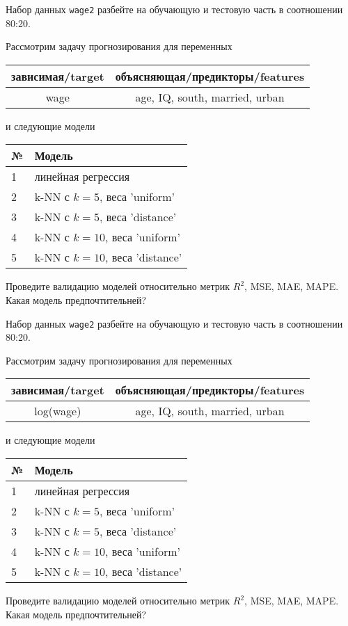 \begin{exercise}
Набор данных \texttt{wage2} разбейте на обучающую и тестовую часть
в соотношении 80:20.

Рассмотрим задачу прогнозирования для переменных
\begin{center}
	\begin{tabular}{|c|c|}\hline
		зависимая/target & объясняющая/предикторы/features \\ \hline
		wage & age, IQ, south, married, urban \\ \hline
	\end{tabular}
\end{center}
и следующие модели
\begin{center}
	\begin{tabular}{|l|l|}\hline
		№ & Модель \\ \hline
		1 & линейная регрессия\\
		2 & k-NN с \(k=5\), веса 'uniform' \\
		3 & k-NN с \(k=5\), веса 'distance' \\
		4 & k-NN с \(k=10\), веса 'uniform' \\
		5 & k-NN с \(k=10\), веса 'distance' \\ \hline
	\end{tabular}
\end{center}
Проведите валидацию моделей относительно метрик \(R^2\), MSE, MAE,
MAPE. Какая модель предпочтительней?
\end{exercise}

\begin{exercise}
Набор данных \texttt{wage2} разбейте на обучающую и тестовую часть
в соотношении 80:20.

Рассмотрим задачу прогнозирования для переменных
\begin{center}
	\begin{tabular}{|c|c|}\hline
		зависимая/target & объясняющая/предикторы/features \\ \hline
		log(wage) & age, IQ, south, married, urban \\ \hline
	\end{tabular}
\end{center}
и следующие модели
\begin{center}
	\begin{tabular}{|l|l|}\hline
		№ & Модель \\ \hline
		1 & линейная регрессия\\
		2 & k-NN с \(k=5\), веса 'uniform' \\
		3 & k-NN с \(k=5\), веса 'distance' \\
		4 & k-NN с \(k=10\), веса 'uniform' \\
		5 & k-NN с \(k=10\), веса 'distance' \\ \hline
	\end{tabular}
\end{center}
Проведите валидацию моделей относительно метрик \(R^2\), MSE, MAE,
MAPE. Какая модель предпочтительней?
\end{exercise}


